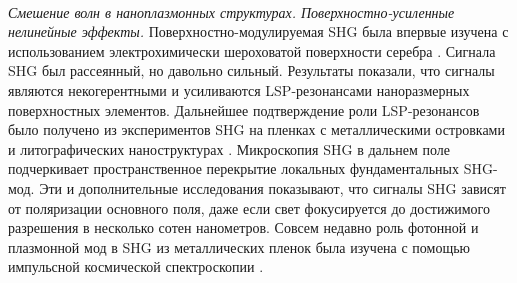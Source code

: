 \\
\hspace*{2mm}
\textit{Смешение волн в наноплазмонных структурах. Поверхностно-усиленные нелинейные эффекты.} Поверхностно-модулируемая SHG была впервые изучена с использованием электрохимически шероховатой поверхности серебра \cite{chen1981surface}. Сигнала SHG был рассеянный, но давольно сильный. Результаты показали, что сигналы являются некогерентными и усиливаются LSP-резонансами наноразмерных поверхностных элементов. Дальнейшее подтверждение роли LSP-резонансов было получено из экспериментов SHG на пленках с металлическими островками и литографических наноструктурах \cite{wokaun1981surface}. Микроскопия SHG в дальнем поле подчеркивает пространственное перекрытие локальных фундаментальных SHG-мод. Эти и дополнительные исследования показывают, что сигналы SHG зависят от поляризации основного поля, даже если свет фокусируется до достижимого разрешения в несколько сотен нанометров.  Совсем недавно роль фотонной и плазмонной мод в SHG из металлических пленок была изучена с помощью импульсной космической спектроскопии \cite{grosse2012nonlinear}.

